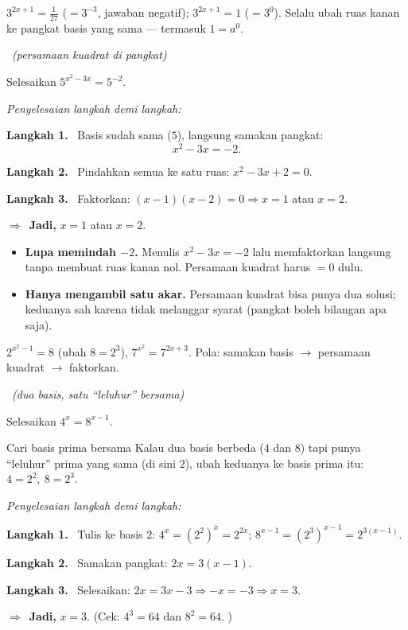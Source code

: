 \documentclass[11pt,a4paper]{report}
\theoremstyle{gaya}
\newcommand{\jawab}{\par\smallskip\noindent\textit{\textcolor{oranye}{Penyelesaian langkah demi langkah:}}\par\smallskip}
\newcommand{\langkah}[1]{\par\smallskip\noindent\textbf{\textcolor{biru}{Langkah #1.}}\ }
\newcommand{\jadi}{\par\smallskip\noindent$\Rightarrow$\ \textbf{Jadi, }}
\newcommand{\soalno}[2]{%
  \par\bigskip
  \noindent{\large\bfseries\color{ungu}\rule[-2pt]{4pt}{14pt}\ Soal #1}%
  \ {\normalfont\itshape\color{gray}(#2)}\par\nopagebreak\smallskip}
\begin{document}
\begin{variasi}
$3^{2x+1}=\tfrac1{27}$ ($=3^{-3}$, jawaban negatif); $3^{2x+1}=1$ ($=3^0$).
Selalu ubah ruas kanan ke pangkat basis yang sama --- termasuk $1=a^0$.
\end{variasi}

\soalno{1.2.2}{persamaan kuadrat di pangkat}
\begin{soalbox}{}
Selesaikan $5^{x^2-3x} = 5^{-2}$.
\end{soalbox}

\jawab
\langkah{1} Basis sudah sama ($5$), langsung samakan pangkat:
\[
x^2 - 3x = -2.
\]
\langkah{2} Pindahkan semua ke satu ruas: $x^2-3x+2=0$.
\langkah{3} Faktorkan: $(x-1)(x-2)=0 \Rightarrow x=1$ atau $x=2$.
\jadi $x=1$ atau $x=2$.

\begin{jebakan}
\begin{itemize}[leftmargin=*,topsep=2pt]
  \item \textbf{Lupa memindah $-2$.} Menulis $x^2-3x=-2$ lalu memfaktorkan
  langsung tanpa membuat ruas kanan nol. Persamaan kuadrat harus $=0$ dulu.
  \item \textbf{Hanya mengambil satu akar.} Persamaan kuadrat bisa punya dua
  solusi; keduanya sah karena tidak melanggar syarat (pangkat boleh bilangan
  apa saja).
\end{itemize}
\end{jebakan}

\begin{variasi}
$2^{x^2-1}=8$ (ubah $8=2^3$), $7^{x^2}=7^{2x+3}$. Pola: samakan basis $\to$
persamaan kuadrat $\to$ faktorkan.
\end{variasi}

\soalno{1.2.3}{dua basis, satu ``leluhur'' bersama}
\begin{soalbox}{}
Selesaikan $4^{x} = 8^{x-1}$.
\end{soalbox}

\begin{ingat}{Cari basis prima bersama}
Kalau dua basis berbeda ($4$ dan $8$) tapi punya ``leluhur'' prima yang sama
(di sini $2$), ubah keduanya ke basis prima itu: $4=2^2,\ 8=2^3$.
\end{ingat}

\jawab
\langkah{1} Tulis ke basis $2$: $4^x = (2^2)^x = 2^{2x}$; $8^{x-1}=(2^3)^{x-1}=2^{3(x-1)}$.
\langkah{2} Samakan pangkat: $2x = 3(x-1)$.
\langkah{3} Selesaikan: $2x = 3x - 3 \Rightarrow -x = -3 \Rightarrow x = 3$.
\jadi $x=3$. (Cek: $4^3=64$ dan $8^{2}=64$. \checkmark)
\end{document}
